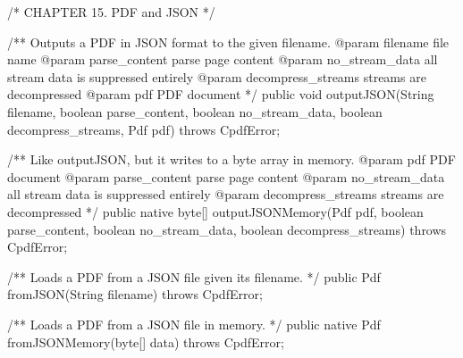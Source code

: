 /* CHAPTER 15. PDF and JSON */

/** Outputs a PDF in JSON format to the given filename.
@param filename file name
@param parse_content parse page content
@param no_stream_data all stream data is suppressed entirely
@param decompress_streams streams are decompressed
@param pdf PDF document */
public void outputJSON(String filename, boolean parse_content,
                       boolean no_stream_data, boolean decompress_streams,
                       Pdf pdf)
    throws CpdfError; 

/** Like outputJSON, but it writes to a byte array in memory.
@param pdf PDF document
@param parse_content parse page content
@param no_stream_data all stream data is suppressed entirely
@param decompress_streams streams are decompressed */
public native byte[] outputJSONMemory(Pdf pdf, boolean parse_content,
                                      boolean no_stream_data,
                                      boolean decompress_streams)
    throws CpdfError;

/** Loads a PDF from a JSON file given its filename. */
public Pdf fromJSON(String filename) throws CpdfError;

/** Loads a PDF from a JSON file in memory. */
public native Pdf fromJSONMemory(byte[] data) throws CpdfError;
